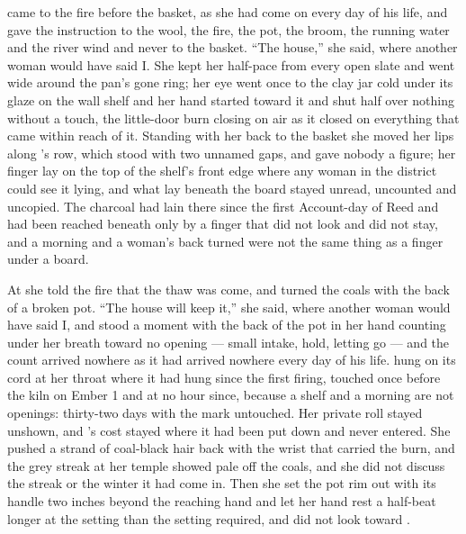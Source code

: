 \scenebreak

 came to the fire before the basket, as she had come on every day of his life, and gave the instruction to the wool, the fire, the pot, the broom, the running water and the river wind and never to the basket. “The house,” she said, where another woman would have said I. She kept her half-pace from every open slate and went wide around the pan's gone ring; her eye went once to the clay jar cold under its glaze on the wall shelf and her hand started toward it and shut half over nothing without a touch, the little-door burn closing on air as it closed on everything that came within reach of it. Standing with her back to the basket she moved her lips along 's row, which stood with two unnamed gaps, and gave nobody a figure; her finger lay on the top of the shelf's front edge where any woman in the district could see it lying, and what lay beneath the board stayed unread, uncounted and uncopied. The charcoal had lain there since the first Account-day of Reed and had been reached beneath only by a finger that did not look and did not stay, and a morning and a woman's back turned were not the same thing as a finger under a board.

At  she told the fire that the thaw was come, and turned the coals with the back of a broken pot. “The house will keep it,” she said, where another woman would have said I, and stood a moment with the back of the pot in her hand counting under her breath toward no opening --- small intake, hold, letting go --- and the count arrived nowhere as it had arrived nowhere every day of his life.  hung on its cord at her throat where it had hung since the first firing, touched once before the kiln on Ember 1 and at no hour since, because a shelf and a morning are not openings: thirty-two days with the mark untouched. Her private roll stayed unshown, and 's cost stayed where it had been put down and never entered. She pushed a strand of coal-black hair back with the wrist that carried the burn, and the grey streak at her temple showed pale off the coals, and she did not discuss the streak or the winter it had come in. Then she set the pot rim out with its handle two inches beyond the reaching hand and let her hand rest a half-beat longer at the setting than the setting required, and did not look toward .

\scenebreak

